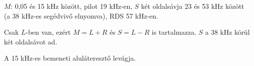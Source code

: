 $M$: 0,05 és 15 kHz között, pilot 19 kHz-en, $S$ két oldalsávja 23 és 53 kHz között (a 38 kHz-es segédvivő elnyomva), RDS 57 kHz-en.

Csak $L$-ben van, ezért $M=L+R$ és $S=L-R$ is tartalmazza. $S$ a 38 kHz körül két oldalsávot ad.

\begin{center}\end{center}



\begin{center}\end{center}

A 15 kHz-es bemeneti aluláteresztő levágja.

\begin{center}\end{center}

